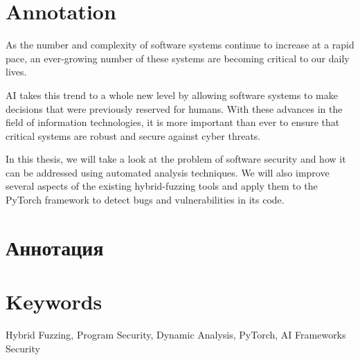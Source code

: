 \documentclass[a4paper,14pt]{extarticle}
\begin{document}
\newpage

{
	\hypersetup{linkcolor=black}
	\tableofcontents
}

\newpage
\section*{Annotation}

As the number and complexity of software systems continue to increase at a rapid pace, an ever-growing number of these systems are becoming critical to our daily lives.

AI takes this trend to a whole new level by allowing software systems to make decisions that were previously reserved for humans. With these advances in the field of information technologies, it is more important than ever to ensure that critical systems are robust and secure against cyber threats.

In this thesis, we will take a look at the problem of software security and how it can be addressed using automated analysis techniques. We will also improve several aspects of the existing hybrid-fuzzing tools and apply them to the PyTorch framework to detect bugs and vulnerabilities in its code.

\section*{\foreignlanguage{russian}{Аннотация}} %
\foreignlanguage{russian}{
}

\section*{Keywords}
Hybrid Fuzzing, Program Security, Dynamic Analysis, PyTorch, AI Frameworks Security
\pagebreak













\newpage

\printbibliography[heading=bibintoc]   %
\end{document}
